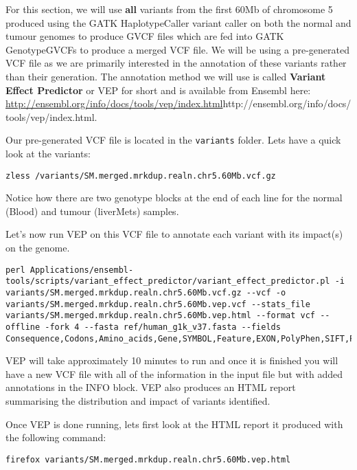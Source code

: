 For this section, we will use \textbf{all} variants from the first 60Mb of chromosome 5 produced using the GATK HaplotypeCaller variant caller on both the normal and tumour genomes to produce GVCF files which are fed into GATK GenotypeGVCFs to produce a merged VCF file. We will be using a pre-generated VCF file as we are primarily interested in the annotation of these variants rather than their generation. The annotation method we will use is called \textbf{Variant Effect Predictor} or VEP for short and is available from Ensembl here: \url{http://ensembl.org/info/docs/tools/vep/index.html}{http://ensembl.org/info/docs/tools/vep/index.html}.

\begin{steps}
Our pre-generated VCF file is located in the \texttt{variants} folder. Lets have a quick look at the variants:
\begin{lstlisting}
zless /variants/SM.merged.mrkdup.realn.chr5.60Mb.vcf.gz
\end{lstlisting}
\end{steps}

Notice how there are two genotype blocks at the end of each line for the normal (Blood) and tumour (liverMets) samples.

Let's now run VEP on this VCF file to annotate each variant with its impact(s) on the genome.

\begin{steps}
\begin{lstlisting}
perl Applications/ensembl-tools/scripts/variant_effect_predictor/variant_effect_predictor.pl -i variants/SM.merged.mrkdup.realn.chr5.60Mb.vcf.gz --vcf -o variants/SM.merged.mrkdup.realn.chr5.60Mb.vep.vcf --stats_file variants/SM.merged.mrkdup.realn.chr5.60Mb.vep.html --format vcf --offline -fork 4 --fasta ref/human_g1k_v37.fasta --fields Consequence,Codons,Amino_acids,Gene,SYMBOL,Feature,EXON,PolyPhen,SIFT,Protein_position,BIOTYPE
\end{lstlisting}
\end{steps}

VEP will take approximately 10 minutes to run and once it is finished you will have a new VCF file with all of the information in the input file but with added annotations in the INFO block. VEP also produces an HTML report summarising the distribution and impact of variants identified.

\begin{steps}
Once VEP is done running, lets first look at the HTML report it produced with the following command:
\begin{lstlisting}
firefox variants/SM.merged.mrkdup.realn.chr5.60Mb.vep.html
\end{lstlisting}
\end{steps}


